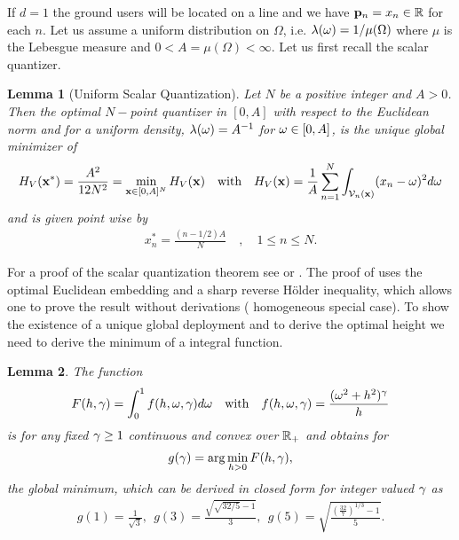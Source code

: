 \documentclass[smallabstract,smallcaptions]{dccpaper}
\newtheorem{lemma}{Lemma}
\newcommand{\df}{\ensuremath{\lam}}         %
\newcommand{\Vor}{\ensuremath{\mathcal{V}}}         %
\begin{document}
If $d=1$ the ground users will be located on a line and we have ${\mathbf p}_n=x_n\in{\ensuremath{\mathbb R}}$ for each $n$. Let us assume a uniform
distribution on $\Omega$, i.e.  $\df(\ome)=1/\mu(\Omega)$ where $\mu$ is the Lebesgue measure and
$0<A=\mu(\Omega)<\infty$. 
%
Let us first recall the scalar quantizer.
%
\begin{lemma}[Uniform Scalar Quantization]\label{lem:UniformScalarQuantizer}
  Let $N$ be a positive integer and $A>0$. Then the optimal $N-$point quantizer in $[0,A]$ with respect to the
  Euclidean norm and for a uniform density, $\lambda(\omega)=A^{-1}$ for $\omega\in[0,A]$,  is the unique global minimizer of
  \begin{align}
    H_V(\vx^*)=\frac{A^2}{12N^2}=\min_{\vx\in[0,A]^N} H_V(\vx) 
       \quad\text{with}\quad H_V(\vx)=\frac{1}{A}\sum_{n=1}^N \int_{\Vor_n(\vx)} (x_n-\ome)^2d\ome
  \end{align}
  and is given point wise by
  \begin{align}
    x_n^*= \frac{(n-1/2)A}{N} \quad, \quad 1\leq n\leq N.
  \end{align}
\end{lemma}
%
For a proof of the scalar quantization theorem see \cite{GN98} or
  \cite{KJ17}.  The proof of \cite[Thm.1]{KJ17} uses the optimal
  Euclidean  embedding and a sharp reverse Hölder inequality, which allows one to prove the result without derivations (
  homogeneous special case). 
\fi
%
To show the existence of a unique global deployment and to derive the optimal height we need to derive the minimum of a
integral function. 
%
\begin{lemma}\label{lem:ggam}
  The function 
  \begin{align}
    F(h,\gamma)=\int_0^1  f(h,\omega,\gamma) d\omega \quad\text{with}\quad f(h,\omega,\gamma)=\frac{(\omega^2+h^2)^{\gamma}}{h} 
  \end{align}
  is for any fixed $\gamma\geq 1$ continuous and convex over ${\mathbb R}_+$ and obtains for 
  \begin{align}
    g(\gamma)=\arg\min_{h>0} F(h,\gamma),
  \end{align}
  the global minimum, which can be derived in closed form for integer valued $\gamma$ as 
  \begin{align}
    g(1) = \frac{1}{\sqrt{3}},\ \  g(3) = \frac{\sqrt{\sqrt{32/5}-1}}{3}, 
    \ \  g(5) = \sqrt{\frac{ (\frac{32}{7})^{1/3}-1}{5}}.\label{eq:ggam}
 \end{align}
\end{lemma}
\end{document}
